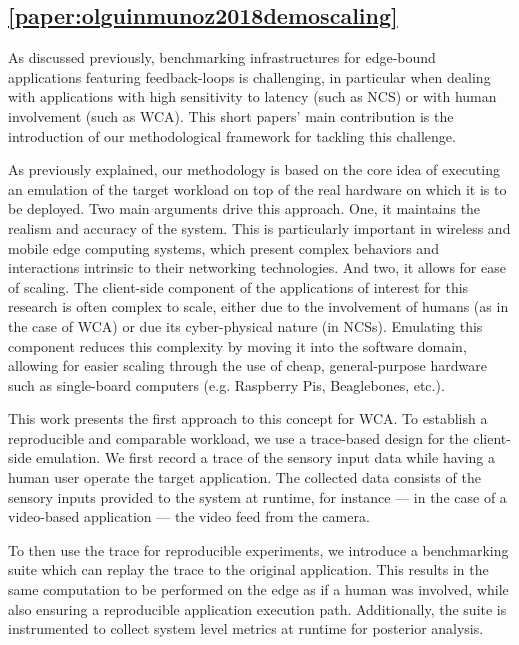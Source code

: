 \subsection{\cref{paper:olguinmunoz2018demoscaling}}\label{summary:2018demo}

As discussed previously, benchmarking infrastructures for edge-bound applications featuring feedback-loops is challenging, in particular when dealing with applications with high sensitivity to latency (such as \ac{NCS}) or with human involvement (such as \ac{WCA}).
This short papers' main contribution is the introduction of our methodological framework for tackling this challenge.

As previously explained, our methodology is based on the core idea of executing an emulation of the target workload on top of the real hardware on which it is to be deployed.
Two main arguments drive this approach.
One, it maintains the realism and accuracy of the system.
This is particularly important in wireless and mobile edge computing systems, which present complex behaviors and interactions intrinsic to their networking technologies.
And two, it allows for ease of scaling.
The client-side component of the applications of interest for this research is often complex to scale, either due to the involvement of humans (as in the case of \ac{WCA}) or due its cyber-physical nature (in \acp{NCS}).
Emulating this component reduces this complexity by moving it into the software domain, allowing for easier scaling through the use of cheap, general-purpose hardware such as single-board computers (e.g. Raspberry Pis, Beaglebones, etc.).

This work presents the first approach to this concept for \ac{WCA}.
To establish a reproducible and comparable workload, we use a trace-based design for the client-side emulation.
We first record a trace of the sensory input data while having a human user operate the target application.
The collected data consists of the sensory inputs provided to the system at runtime, for instance --- in the case of a video-based application --- the video feed from the camera.

To then use the trace for reproducible experiments, we introduce a benchmarking suite which can replay the trace to the original application.
This results in the same computation to be performed on the edge as if a human was involved, while also ensuring a reproducible application execution path.
Additionally, the suite is instrumented to collect system level metrics at runtime for posterior analysis.

